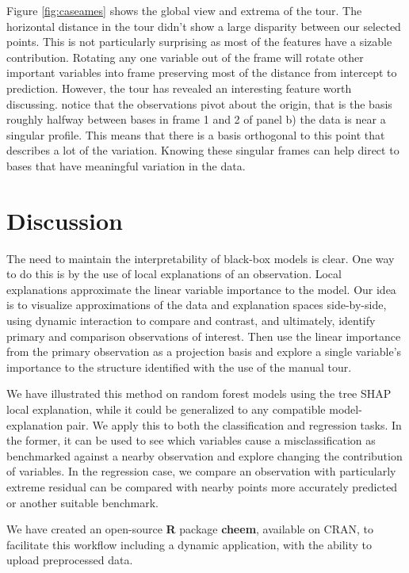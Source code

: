 \documentclass[
]{article}
\begin{document}
Figure \ref{fig:caseames} shows the global view and extrema of the tour. The horizontal distance in the tour didn't show a large disparity between our selected points. This is not particularly surprising as most of the features have a sizable contribution. Rotating any one variable out of the frame will rotate other important variables into frame preserving most of the distance from intercept to prediction. However, the tour has revealed an interesting feature worth discussing. notice that the observations pivot about the origin, that is the basis roughly halfway between bases in frame 1 and 2 of panel b) the data is near a singular profile. This means that there is a basis orthogonal to this point that describes a lot of the variation. Knowing these singular frames can help direct to bases that have meaningful variation in the data.

\hypertarget{sec:discussion}{%
\section{Discussion}\label{sec:discussion}}

The need to maintain the interpretability of black-box models is clear. One way to do this is by the use of local explanations of an observation. Local explanations approximate the linear variable importance to the model. Our idea is to visualize approximations of the data and explanation spaces side-by-side, using dynamic interaction to compare and contrast, and ultimately, identify primary and comparison observations of interest. Then use the linear importance from the primary observation as a projection basis and explore a single variable's importance to the structure identified with the use of the manual tour.

We have illustrated this method on random forest models using the tree SHAP local explanation, while it could be generalized to any compatible model-explanation pair. We apply this to both the classification and regression tasks. In the former, it can be used to see which variables cause a misclassification as benchmarked against a nearby observation and explore changing the contribution of variables. In the regression case, we compare an observation with particularly extreme residual can be compared with nearby points more accurately predicted or another suitable benchmark.

We have created an open-source \textbf{R} package \textbf{cheem}, available on CRAN, to facilitate this workflow including a dynamic application, with the ability to upload preprocessed data.
\end{document}
